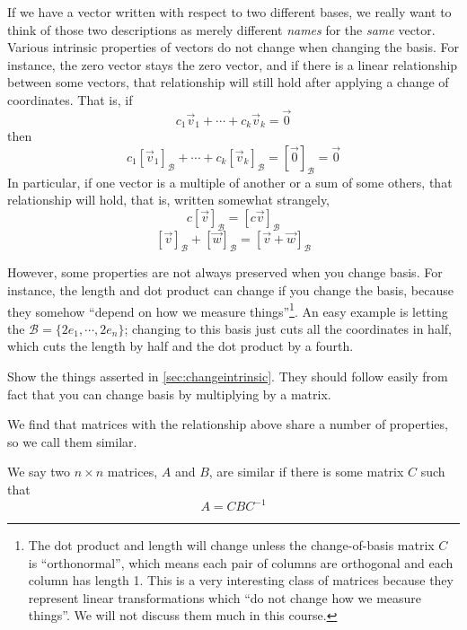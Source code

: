 \documentclass[Main.tex]{subfiles}
\begin{document}
\begin{ImportantRemark}
  \label{sec:changeintrinsic}
  If we have a vector written with respect to two different bases, we really want to think of those two descriptions as merely different \emph{names} for the \emph{same} vector.
  Various intrinsic properties of vectors do not change when changing the basis.
  For instance, the zero vector stays the zero vector, and if there is a linear relationship between some vectors, that relationship will still hold after applying a change of coordinates.  
  That is, if
  \[c_1\vec{v}_1 + \cdots + c_k\vec{v}_k = \vec{0}\]
  then 
  \[c_1[\vec{v}_1]_\mathcal{B} + \cdots + c_k[\vec{v}_k]_\mathcal{B} = [\vec{0}]_\mathcal{B}=\vec{0}\]
  In particular, if one vector is a multiple of another or a sum of some others, that relationship will hold, that is, written somewhat strangely,
  \[c[\vec{v}]_\mathcal{B} = [c\vec{v}]_\mathcal{B}\]
  \[[\vec{v}]_\mathcal{B} + [\vec{w}]_\mathcal{B} = [\vec{v} + \vec{w}]_\mathcal{B}\]
  
  However, some properties are not always preserved when you change basis.
  For instance, the length and dot product can change if you change the basis, because they somehow ``depend on how we measure things''\footnote{The dot product and length will change unless the change-of-basis matrix $C$ is ``orthonormal'', which means each pair of columns are orthogonal and each column has length 1.  This is a very interesting class of matrices because they represent linear transformations which ``do not change how we measure things''.   We will not discuss them much in this course.}.
  An easy example is letting the $\mathcal{B}=\{2e_1,\cdots,2e_n\}$; changing to this basis just cuts all the coordinates in half, which cuts the length by half and the dot product by a fourth.
\end{ImportantRemark}

\begin{Ex}
  Show the things asserted in \ref{sec:changeintrinsic}.
  They should follow easily from fact that you can change basis by multiplying by a matrix.
\end{Ex}

We find that matrices with the relationship above share a number of properties, so we call them similar.  
\begin{Def}
  We say two $n\times n$ matrices, $A$ and $B$, are similar if there is some matrix $C$ such that
  \[A=CBC^{-1}\]
\end{Def}
\end{document}
